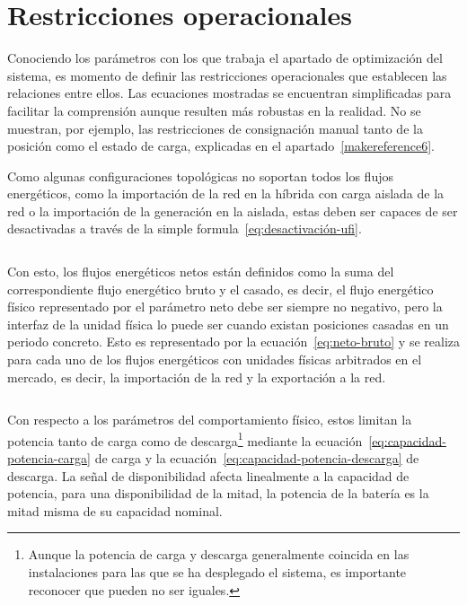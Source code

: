 \section{Restricciones operacionales}
\label{makereference5.2}

Conociendo los parámetros con los que trabaja el apartado de optimización del sistema, es momento de definir las restricciones operacionales que establecen las relaciones entre ellos. Las ecuaciones mostradas se encuentran simplificadas para facilitar la comprensión aunque resulten más robustas en la realidad. No se muestran, por ejemplo, las restricciones de consignación manual tanto de la posición como el estado de carga, explicadas en el apartado~\ref{makereference6}.

Como algunas configuraciones topológicas no soportan todos los flujos energéticos, como la importación de la red en la híbrida con carga aislada de la red o la importación de la generación en la aislada, estas deben ser capaces de ser desactivadas a través de la simple formula~\ref{eq:desactivación-ufi}.

\begin{equation}
  \label{eq:desactivación-ufi}
\end{equation}

Con esto, los flujos energéticos netos están definidos como la suma del correspondiente flujo energético bruto y el casado, es decir, el flujo energético físico representado por el parámetro neto debe ser siempre no negativo, pero la interfaz de la unidad física lo puede ser cuando existan posiciones casadas en un periodo concreto. Esto es representado por la ecuación~\ref{eq:neto-bruto} y se realiza para cada uno de los flujos energéticos con unidades físicas arbitrados en el mercado, es decir, la importación de la red y la exportación a la red.

\begin{equation}
  \label{eq:neto-bruto}
\end{equation}

Con respecto a los parámetros del comportamiento físico, estos limitan la potencia tanto de carga como de descarga\footnote{Aunque la potencia de carga y descarga generalmente coincida en las instalaciones para las que se ha desplegado el sistema, es importante reconocer que pueden no ser iguales.} mediante la ecuación~\ref{eq:capacidad-potencia-carga} de carga y la ecuación~\ref{eq:capacidad-potencia-descarga} de descarga. La señal de disponibilidad afecta linealmente a la capacidad de potencia, para una disponibilidad de la mitad, la potencia de la batería es la mitad misma de su capacidad nominal.

